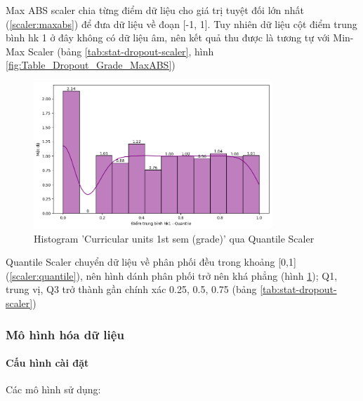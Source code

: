     \FloatBarrier

    Max ABS scaler chia từng điểm dữ liệu cho giá trị tuyệt đối lớn nhất (\ref{scaler:maxabs}) để đưa dữ liệu về đoạn [-1, 1]. Tuy nhiên dữ liệu cột điểm trung bình hk 1 ở đây không có dữ liệu âm, nên kết quả thu được là tương tự với Min-Max Scaler (bảng \ref{tab:stat-dropout-scaler}, hình \ref{fig:Table_Dropout_Grade_MaxABS})

    

    \begin{figure}[htp]
        \centering
        \includegraphics[width=0.80\textwidth]{images/Table_Dropout_Grade_Quantile.png}
        \caption{Histogram 'Curricular units 1st sem (grade)' qua Quantile Scaler}
        \label{fig:Table_Dropout_Grade_Quantile}
    \end{figure}

    \FloatBarrier

    Quantile Scaler chuyển dữ liệu về phân phối đều trong khoảng [0,1] (\ref{scaler:quantile}), nên hình dánh phân phối trở nên khá phẳng (hình \ref{fig:Table_Dropout_Grade_Quantile}); Q1, trung vị, Q3 trở thành gần chính xác 0.25, 0.5, 0.75 (bảng \ref{tab:stat-dropout-scaler})

\subsubsection{Mô hình hóa dữ liệu}
    \paragraph{Cấu hình cài đặt} \label{paragraph:model-setup}
    \leavevmode

    Các mô hình sử dụng:

